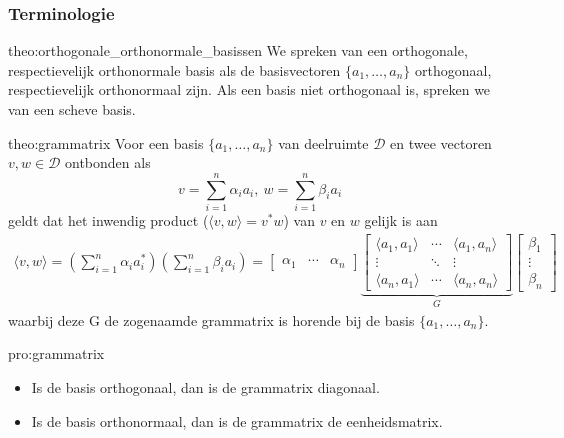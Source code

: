 \subsubsection{Terminologie}

\vspace{0.5cm}

\begin{theo}{theo:orthogonale_orthonormale_basissen}
    We spreken van een orthogonale, respectievelijk orthonormale basis als de basisvectoren $\{a_1, \ldots, a_n\}$ orthogonaal, respectievelijk orthonormaal zijn. Als een basis niet orthogonaal is, spreken we van een scheve basis.
\end{theo}

\begin{theo}[Grammatrix]{theo:grammatrix}
    Voor een basis $\{a_1, \ldots, a_n\}$ van deelruimte $\mathcal{D}$ en twee vectoren $v, w \in \mathcal{D}$ ontbonden als
    \begin{equation*}
            v = \sum_{i=1}^{n} \alpha_i a_i, \
            w = \sum_{i=1}^{n} \beta_i a_i
    \end{equation*}
    geldt dat het inwendig product ($\langle v, w \rangle = v^*w$) van $v$ en $w$ gelijk is aan
    \begin{align*}
        \langle v, w \rangle 
            = \left( \sum_{i=1}^{n} \alpha_i a_i^* \right)\left( \sum_{i=1}^{n} \beta_i a_i \right) 
            = 
                \begin{bmatrix} \alpha_1 & \cdots & \alpha_n \end{bmatrix} 
                \underbrace{\begin{bmatrix} \langle a_1, a_1 \rangle & \cdots & \langle a_1, a_n \rangle \\ \vdots & \ddots & \vdots \\ \langle a_n, a_1 \rangle & \cdots & \langle a_n, a_n \rangle \end{bmatrix}}_{G} 
                \begin{bmatrix} \beta_1 \\ \vdots \\ \beta_n \end{bmatrix}
    \end{align*}
    waarbij deze G de zogenaamde grammatrix is horende bij de basis $\{a_1, \ldots, a_n\}$.
\end{theo}

\begin{pro}[Grammatrix]{pro:grammatrix}
    \begin{itemize}
        \item Is de basis orthogonaal, dan is de grammatrix diagonaal.
        \item Is de basis orthonormaal, dan is de grammatrix de eenheidsmatrix.
    \end{itemize}
\end{pro}

